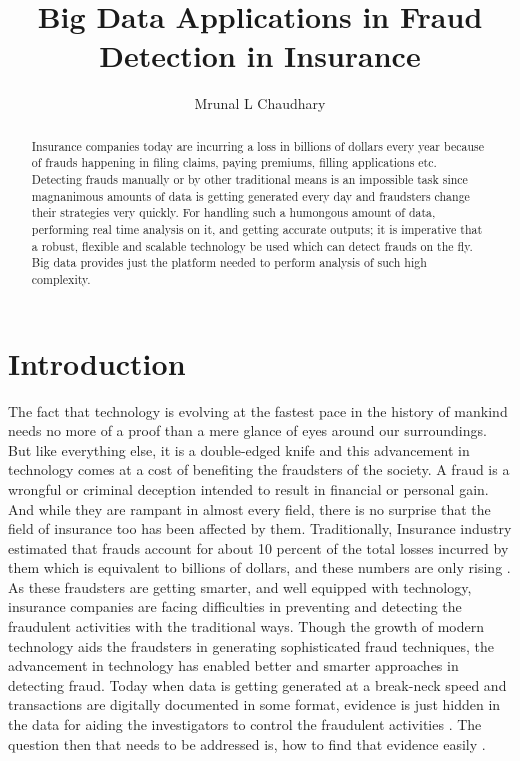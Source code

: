 \documentclass[sigconf]{acmart}
\begin{document}
\title{Big Data Applications in Fraud Detection in Insurance}

\author{Mrunal L Chaudhary}

\renewcommand{\shortauthors}{B. Trovato et al.}


\begin{abstract}
Insurance companies today are incurring a loss in billions of dollars every year because of frauds happening in filing claims, paying premiums, filling applications etc. Detecting frauds manually or by other traditional means is an impossible task since magnanimous amounts of data is getting generated every day and fraudsters change their strategies very quickly. For handling such a humongous amount of data, performing real time analysis on it, and getting accurate outputs; it is imperative that a robust, flexible and scalable technology be used which can detect frauds on the fly. Big data provides just the platform needed to perform analysis of such high complexity.
\end{abstract}



\maketitle

\section{Introduction}
The fact that technology is evolving at the fastest pace in the history of mankind needs no more of a proof than a mere glance of eyes around our surroundings. But like everything else, it is a double-edged knife and this advancement in technology comes at a cost of benefiting the fraudsters of the society. A fraud is a wrongful or criminal deception intended to result in financial or personal gain. And while they are rampant in almost every field, there is no surprise that the field of insurance too has been affected by them. Traditionally, Insurance industry estimated that frauds account for about 10 percent of the total losses incurred by them which is equivalent to billions of dollars, and these numbers are only rising \cite{link1}. As these fraudsters are getting smarter, and well equipped with technology, insurance companies are facing difficulties in preventing and detecting the fraudulent activities with the traditional ways. Though the growth of modern technology aids the fraudsters in generating sophisticated fraud techniques, the advancement in technology has enabled better and smarter approaches in detecting fraud. Today when data is getting generated at a break-neck speed and transactions are digitally documented in some format, evidence is just hidden in the data for aiding the investigators to control the fraudulent activities \cite{link4}. The question then that needs to be addressed is, how to find that evidence easily \cite{link4}.
\end{document}
